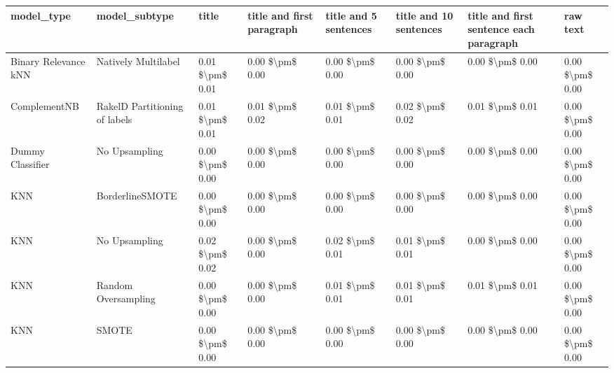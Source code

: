 \begin{tabular}{llllllll}
\toprule
                     model\_type &                 model\_subtype &           title & title and first paragraph & title and 5 sentences & title and 10 sentences & title and first sentence each paragraph &        raw text \\
\midrule
           Binary Relevance kNN &           Natively Multilabel & 0.01 \$\textbackslash pm\$ 0.01 &           0.00 \$\textbackslash pm\$ 0.00 &       0.00 \$\textbackslash pm\$ 0.00 &        0.00 \$\textbackslash pm\$ 0.00 &                         0.00 \$\textbackslash pm\$ 0.00 & 0.00 \$\textbackslash pm\$ 0.00 \\
                   ComplementNB & RakelD Partitioning of labels & 0.01 \$\textbackslash pm\$ 0.01 &           0.01 \$\textbackslash pm\$ 0.02 &       0.01 \$\textbackslash pm\$ 0.01 &        0.02 \$\textbackslash pm\$ 0.02 &                         0.01 \$\textbackslash pm\$ 0.01 & 0.00 \$\textbackslash pm\$ 0.00 \\
               Dummy Classifier &                 No Upsampling & 0.00 \$\textbackslash pm\$ 0.00 &           0.00 \$\textbackslash pm\$ 0.00 &       0.00 \$\textbackslash pm\$ 0.00 &        0.00 \$\textbackslash pm\$ 0.00 &                         0.00 \$\textbackslash pm\$ 0.00 & 0.00 \$\textbackslash pm\$ 0.00 \\
                            KNN &               BorderlineSMOTE & 0.00 \$\textbackslash pm\$ 0.00 &           0.00 \$\textbackslash pm\$ 0.00 &       0.00 \$\textbackslash pm\$ 0.00 &        0.00 \$\textbackslash pm\$ 0.00 &                         0.00 \$\textbackslash pm\$ 0.00 & 0.00 \$\textbackslash pm\$ 0.00 \\
                            KNN &                 No Upsampling & 0.02 \$\textbackslash pm\$ 0.02 &           0.00 \$\textbackslash pm\$ 0.00 &       0.02 \$\textbackslash pm\$ 0.01 &        0.01 \$\textbackslash pm\$ 0.01 &                         0.00 \$\textbackslash pm\$ 0.00 & 0.00 \$\textbackslash pm\$ 0.00 \\
                            KNN &           Random Oversampling & 0.00 \$\textbackslash pm\$ 0.00 &           0.00 \$\textbackslash pm\$ 0.00 &       0.01 \$\textbackslash pm\$ 0.01 &        0.01 \$\textbackslash pm\$ 0.01 &                         0.01 \$\textbackslash pm\$ 0.01 & 0.00 \$\textbackslash pm\$ 0.00 \\
                            KNN &                         SMOTE & 0.00 \$\textbackslash pm\$ 0.00 &           0.00 \$\textbackslash pm\$ 0.00 &       0.00 \$\textbackslash pm\$ 0.00 &        0.00 \$\textbackslash pm\$ 0.00 &                         0.00 \$\textbackslash pm\$ 0.00 & 0.00 \$\textbackslash pm\$ 0.00 \\

\end{tabular}

